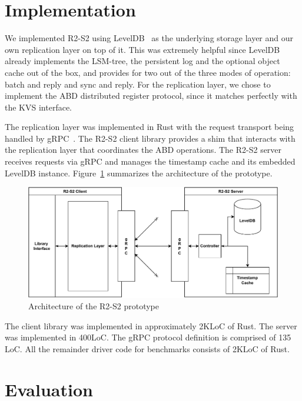 \section{Implementation}\label{sec:r2s2implementation}

We implemented \ac{R2-S2} using LevelDB~\cite{leveldb} as the
underlying storage layer and our own replication layer on top of
it. This was extremely helpful since LevelDB already implements
the \ac{LSM-tree}, the persistent log and the optional object cache
out of the box, and provides for two out of the three modes of
operation: batch and reply and sync and reply. For the
replication layer, we chose to implement the \ac{ABD} distributed
register protocol, since it matches perfectly with the \ac{KVS}
interface.

The replication layer was implemented in Rust with the request transport
being handled by gRPC~\cite{grpc}. The \ac{R2-S2} client library
provides a shim that interacts with the replication layer that
coordinates the \ac{ABD} operations. The \ac{R2-S2} server
receives requests via gRPC and manages the timestamp cache and
its embedded LevelDB instance. Figure~\ref{fig:r2s2arch}
summarizes the architecture of the prototype.

\begin{figure}[ht]
    \centering
    \includegraphics[width=\linewidth]{img/r2s2_arch}
    \caption{Architecture of the \ac{R2-S2}
    prototype}\label{fig:r2s2arch}
\end{figure}

The client library was implemented in approximately 2KLoC of
Rust. The server was implemented in 400LoC. The gRPC protocol
definition is comprised of 135 LoC. All the remainder driver code
for benchmarks consists of 2KLoC of Rust.

\section{Evaluation}\label{sec:r2s2evaluation}

